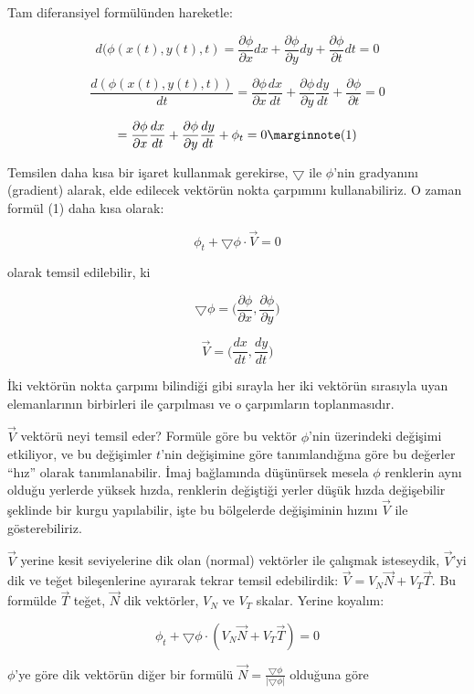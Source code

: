 \documentclass[12pt,fleqn]{article}\usepackage{../../common}
\begin{document}
Tam diferansiyel formülünden hareketle:

$$ 
d(\phi(x(t),y(t),t) = 
\frac{\partial \phi}{\partial x}dx + 
\frac{\partial \phi}{\partial y}dy + 
\frac{\partial \phi}{\partial t}dt  = 0
 $$

$$ 
\frac{d(\phi(x(t),y(t),t))}{dt} = 
\frac{\partial \phi}{\partial x}\frac{dx}{dt} + 
\frac{\partial \phi}{\partial y}\frac{dy}{dt} + 
\frac{\partial \phi}{\partial t} = 0
 $$

$$
 = 
\frac{\partial \phi}{\partial x}\frac{dx}{dt} + 
\frac{\partial \phi}{\partial y}\frac{dy}{dt} + 
\phi_t = 0
\mlabel{1}
$$

Temsilen daha kısa bir işaret kullanmak gerekirse, $\bigtriangledown$
ile $\phi$'nin gradyanını (gradient) alarak, elde edilecek vektörün
nokta çarpımını kullanabiliriz.  O zaman formül (1) daha kısa
olarak:

$$ \phi_t + \bigtriangledown \phi \cdot \vec{V} = 0 $$

olarak temsil edilebilir, ki

$$ \bigtriangledown \phi = \bigg(
\frac{\partial \phi}{\partial x},
\frac{\partial \phi}{\partial y} \bigg)
 $$

$$ \vec{V} = \bigg(
\frac{dx}{dt} ,
\frac{dy}{dt} \bigg)
 $$

İki vektörün nokta çarpımı bilindiği gibi sırayla her iki vektörün
sırasıyla uyan elemanlarının birbirleri ile çarpılması ve o
çarpımların toplanmasıdır.

$\vec{V}$ vektörü neyi temsil eder? Formüle göre bu vektör $\phi$'nin
üzerindeki değişimi etkiliyor, ve bu değişimler $t$'nin değişimine
göre tanımlandığına göre bu değerler ``hız'' olarak
tanımlanabilir. İmaj bağlamında düşünürsek mesela $\phi$ renklerin
aynı olduğu yerlerde yüksek hızda, renklerin değiştiği yerler düşük
hızda değişebilir şeklinde bir kurgu yapılabilir, işte bu bölgelerde
değişiminin hızını $\vec{V}$ ile gösterebiliriz.

$\vec{V}$ yerine kesit seviyelerine dik olan (normal) vektörler ile çalışmak
isteseydik, $\vec{V}$'yi dik ve teğet bileşenlerine ayırarak tekrar temsil
edebilirdik: $\vec{V} = V_N\vec{N} + V_T\vec{T}$. Bu formülde $\vec{T}$ teğet,
$\vec{N}$ dik vektörler, $V_N$ ve $V_T$ skalar. Yerine koyalım:

$$ \phi_t + \bigtriangledown \phi \cdot (V_N\vec{N} + V_T\vec{T}) = 0 $$

$\phi$'ye göre dik vektörün diğer bir formülü $\vec{N} =
\frac{\bigtriangledown\phi}{|\bigtriangledown\phi|}$ olduğuna göre
\end{document}
